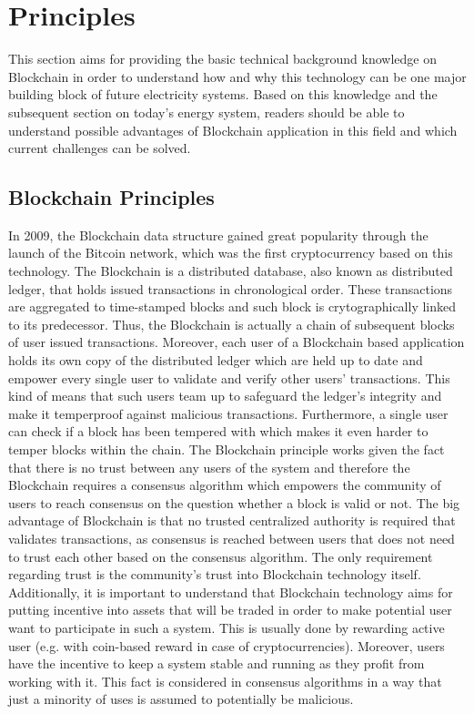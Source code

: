 \documentclass[runningheads]{llncs}
\begin{document}
\section{Principles}
This section aims for providing the basic technical background knowledge on Blockchain in order to understand how and why this technology can be one major building block of future electricity systems. Based on this knowledge and the subsequent section on today's energy system, readers should be able to understand possible advantages of Blockchain application in this field and which current challenges can be solved.

\subsection{Blockchain Principles}
In 2009, the Blockchain data structure gained great popularity through the launch of the Bitcoin network, which was the first cryptocurrency based on this technology. The Blockchain is a distributed database, also known as distributed ledger, that holds issued transactions in chronological order. These transactions are aggregated to time-stamped blocks and such block is crytographically linked to its predecessor. Thus, the Blockchain is actually a chain of subsequent blocks of user issued transactions. Moreover, each user of a Blockchain based application holds its own copy of the distributed ledger which are held up to date and empower every single user to validate and verify other users' transactions. This kind of means that such users team up to safeguard the ledger's integrity and make it temperproof against malicious transactions. Furthermore, a single user can check if a block has been tempered with which makes it even harder to temper blocks within the chain. \newline
The Blockchain principle works given the fact that there is no trust between any users of the system and therefore the Blockchain requires a consensus algorithm which empowers the community of users to reach consensus on the question whether a block is valid or not. The big advantage of Blockchain is that no trusted centralized authority is required that validates transactions, as consensus is reached between users that does not need to trust each other based on the consensus algorithm. The only requirement regarding trust is the community's trust into Blockchain technology itself. Additionally, it is important to understand that Blockchain technology aims for putting incentive into assets that will be traded in order to make potential user want to participate in such a system. This is usually done by rewarding active user (e.g. with coin-based reward in case of cryptocurrencies). Moreover, users have the incentive to keep a system stable and running as they profit from working with it. This fact is considered in consensus algorithms in a way that just a minority of uses is assumed to potentially be malicious. \cite{blockchain} \cite{andoni_energy_bc_review}
\end{document}
